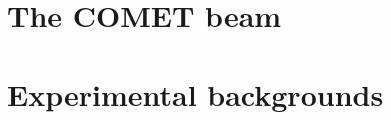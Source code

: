 \section{The COMET beam}\label{sec:COMET_beam}

\section{Experimental backgrounds}\label{sec:backgrounds}




